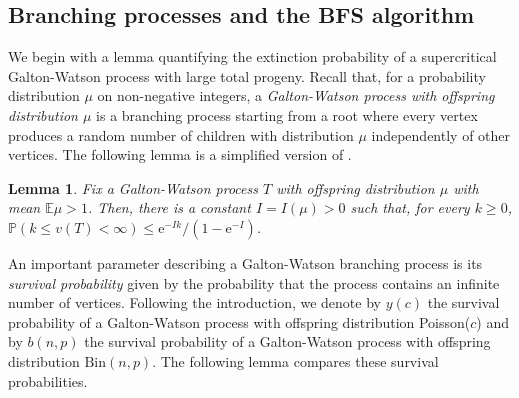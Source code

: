 \documentclass[reqno,final,a4paper]{amsart}
\newtheorem{lemma}[thm]{Lemma}
\theoremstyle{definition}
\def\e{\mathrm{e}}
\newcommand{\1}{\mathbbm{1}}
\begin{document}
\subsection{Branching processes and the BFS algorithm}\label{BFS description}
We begin with a lemma quantifying the extinction probability of a supercritical Galton-Watson process with large total progeny. 
Recall that, for a probability distribution $\mu$ on non-negative integers, a \emph{Galton-Watson process with offspring distribution $\mu$} is a branching process starting from a root where every vertex produces a random number of children with distribution $\mu$ independently of other vertices.
The following lemma is a simplified version of \cite[Theorem~3.8]{vdH18}.

\begin{lemma}\label{lem:branch}
Fix a Galton-Watson process $T$ with offspring distribution $\mu$ with mean $\mathbb E\mu > 1$.
Then, there is a constant $I = I(\mu) > 0$ such that, for every $k\ge 0$, $\mathbb P(k\le v(T) < \infty)\le \e^{-Ik}/(1-\e^{-I})$.
\end{lemma}

An important parameter describing a Galton-Watson branching process is its \emph{survival probability} given by the probability that the process contains an infinite number of vertices.
Following the introduction, we denote by $y(c)$ the survival probability of a Galton-Watson process with offspring distribution Poisson($c$) and by $b(n,p)$ the survival probability of a Galton-Watson process with offspring distribution $\mathrm{Bin}(n,p)$.
The following lemma compares these survival probabilities.
\end{document}
